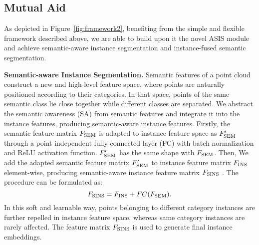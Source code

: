 \documentclass[10pt,twocolumn,letterpaper]{article}
\newcommand{\myparagraph}[1]{{\vspace{0.5em} \noindent \bf #1}}
\begin{document}
\subsection{Mutual Aid}
As depicted in Figure~\ref{fig:framework2}, benefiting from the simple and flexible framework described above, we are able to build upon it the novel ASIS module and achieve semantic-aware instance segmentation and instance-fused semantic segmentation. 

\myparagraph{Semantic-aware Instance Segmentation.}
Semantic features of a point cloud construct a new and high-level feature space, where points are naturally positioned according to their categories.
In that space, points of the same semantic class lie close together while different classes are separated.
We abstract the semantic awareness (SA) from semantic features and integrate it into the instance features, producing semantic-aware instance features. 
Firstly, the semantic feature matrix $F_{\rm SEM}$ is adapted to instance feature space as $F_{\rm SEM}'$ through a point independent fully connected layer (FC) with batch normalization and ReLU activation function.
$F_{\rm SEM}'$ has the same shape with $F_{\rm SEM}$.
Then, We add the adapted semantic feature matrix $F_{\rm SEM}'$ to instance feature matrix $F_{\rm INS}$ element-wise, producing semantic-aware instance feature matrix $F_{\rm SINS}$ .
The procedure can be formulated as:
\begin{equation}
    F_{\rm SINS} = F_{\rm INS} + {FC}(F_{\rm SEM}).
\end{equation}
In this soft and learnable way, points belonging to different category instances are further repelled in instance feature space, whereas same category instances are rarely affected.
The feature matrix $F_{\rm SINS}$ is used to generate final instance embeddings. 
\end{document}
